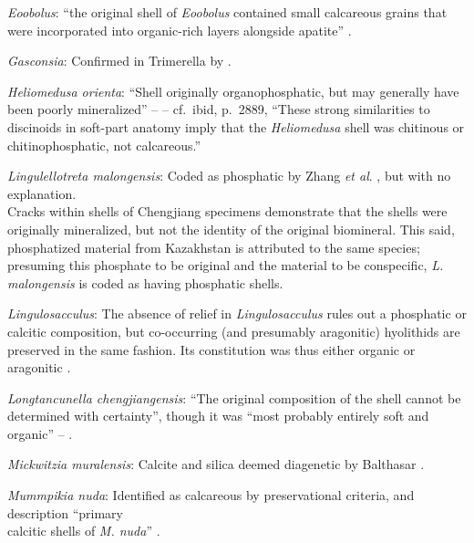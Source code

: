 \documentclass[openany]{book}
\begin{document}
\hypertarget{Eoobolus-coding-127}{}
\emph{Eoobolus}: ``the original shell of \emph{Eoobolus} contained small
calcareous grains that were incorporated into organic-rich layers
alongside apatite'' \citep{Balthasar2007Anearly}.

\hypertarget{Gasconsia-coding-127}{}
\emph{Gasconsia}: Confirmed in Trimerella by
\citet{Balthasar2011Relicaragonite}.

\hypertarget{Heliomedusa_orienta-coding-127}{}
\emph{Heliomedusa orienta}: ``Shell originally organophosphatic, but may
generally have been poorly mineralized'' --
\citet{Williams2007Supplement} -- cf.~ibid, p.~2889, ``These strong
similarities to discinoids in soft-part anatomy imply that the
\emph{Heliomedusa} shell was chitinous or chitinophosphatic, not
calcareous.''

\hypertarget{Lingulellotreta_malongensis-coding-127}{}
\emph{Lingulellotreta malongensis}: Coded as phosphatic by Zhang
\emph{et al}. \citeyearpar{Zhang2014Anearly}, but with no explanation.\\
Cracks within shells of Chengjiang specimens \citep[e.g.][fig.
3]{Zhang2007Noteon} demonstrate that the shells were originally
mineralized, but not the identity of the original biomineral. This said,
phosphatized material from Kazakhstan \citep{Holmer1997EarlyCambrian} is
attributed to the same species; presuming this phosphate to be original
and the material to be conspecific, \emph{L. malongensis} is coded as
having phosphatic shells.

\hypertarget{Lingulosacculus-coding-127}{}
\emph{Lingulosacculus}: The absence of relief in \emph{Lingulosacculus}
rules out a phosphatic or calcitic composition, but co-occurring (and
presumably aragonitic) hyolithids are preserved in the same fashion. Its
constitution was thus either organic or aragonitic
\citep{Balthasar2009EarlyCambrian}.

\hypertarget{Longtancunella_chengjiangensis-coding-127}{}
\emph{Longtancunella chengjiangensis}: ``The original composition of the
shell cannot be determined with certainty'', though it was ``most
probably entirely soft and organic'' --
\citet{Zhang2011Theexceptionally}.

\hypertarget{Mickwitzia_muralensis-coding-127}{}
\emph{Mickwitzia muralensis}: Calcite and silica deemed diagenetic by
Balthasar \citeyearpar{Balthasar2004Shellstructure}.

\hypertarget{Mummpikia_nuda-coding-127}{}
\emph{Mummpikia nuda}: Identified as calcareous by preservational
criteria, and description ``primary\\
calcitic shells of \emph{M. nuda}'' \citep{Balthasar2008iMummpikia}.
\end{document}
